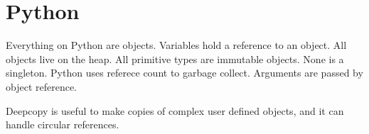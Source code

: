 \section{Python}
Everything on Python are objects. Variables hold a reference to an
object. All objects live on the heap. All primitive types are immutable
objects. None is a singleton. Python uses referece count to garbage
collect. Arguments are passed by object reference.

Deepcopy is useful to make copies of complex user defined objects, and it
can handle circular references.
